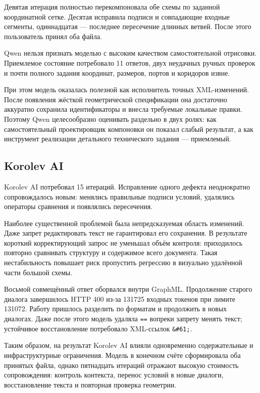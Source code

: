 \documentclass[a4paper,12pt]{extreport}
\newcommand{\code}[1]{\texttt{#1}}
\begin{document}
Девятая итерация полностью перекомпоновала обе схемы по заданной координатной сетке. Десятая исправила подписи и совпадающие входные сегменты, одиннадцатая --- последнее пересечение длинных ветвей. После этого пользователь принял оба файла.

Qwen нельзя признать моделью с высоким качеством самостоятельной отрисовки. Приемлемое состояние потребовало 11 ответов, двух неудачных ручных проверок и почти полного задания координат, размеров, портов и коридоров извне.

При этом модель оказалась полезной как исполнитель точных XML-изменений. После появления жёсткой геометрической спецификации она достаточно аккуратно сохранила идентификаторы и внесла требуемые локальные правки. Поэтому Qwen целесообразно оценивать раздельно в двух ролях: как самостоятельный проектировщик компоновки он показал слабый результат, а как инструмент реализации детального технического задания --- приемлемый.

\subsection{Korolev AI}

Korolev AI потребовал 15 итераций. Исправление одного дефекта неоднократно сопровождалось новым: менялись правильные подписи условий, удалялись операторы сравнения и появлялись пересечения.

Наиболее существенной проблемой была непредсказуемая область изменений. Даже запрет редактировать текст не гарантировал его сохранения. В результате короткий корректирующий запрос не уменьшал объём контроля: приходилось повторно сравнивать структуру и содержимое всего документа. Такая нестабильность повышает риск пропустить регрессию в визуально удалённой части большой схемы.

Восьмой совмещённый ответ оборвался внутри GraphML. Продолжение старого диалога завершилось HTTP 400 из-за 131725 входных токенов при лимите 131072. Работу пришлось разделить по форматам и продолжить в новых диалогах. Даже после этого модель удаляла \code{==} вопреки запрету менять текст; устойчивое восстановление потребовало XML-ссылок \code{\&\#61;}.

Таким образом, на результат Korolev AI влияли одновременно содержательные и инфраструктурные ограничения. Модель в конечном счёте сформировала оба принятых файла, однако пятнадцать итераций отражают высокую стоимость сопровождения: контроль контекста, перенос условий в новые диалоги, восстановление текста и повторная проверка геометрии.
\end{document}
